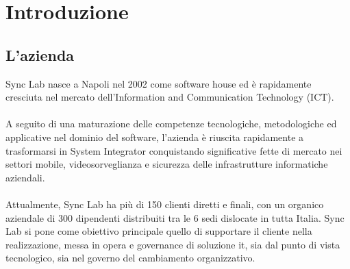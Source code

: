 
\chapter{Introduzione}
\label{cap:introduzione}





\section{L'azienda}

Sync Lab nasce a Napoli nel 2002 come software house ed è rapidamente cresciuta nel
mercato dell’Information and Communication Technology (ICT). 
\\\\
A seguito di una
maturazione delle competenze tecnologiche, metodologiche ed applicative nel dominio
del software, l’azienda è riuscita rapidamente a trasformarsi in System Integrator conquistando 
significative fette di mercato nei settori mobile, videosorveglianza e sicurezza
delle infrastrutture informatiche aziendali. 
\\\\
Attualmente, Sync Lab ha più di 150 clienti
diretti e finali, con un organico aziendale di 300 dipendenti distribuiti tra le 6 sedi
dislocate in tutta Italia.
Sync Lab si pone come obiettivo principale quello di supportare il cliente nella realizzazione, 
messa in opera e governance di soluzione \gls{it}\glsfirstoccur, sia dal punto di vista tecnologico,
sia nel governo del cambiamento organizzativo.


